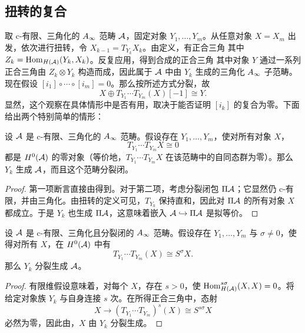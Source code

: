 \subsection{扭转的复合}\label{sec:5e}
取 c-有限、三角化的 $A_\infty$ 范畴 $\mathcal A$，固定对象 $Y_1,\ldots,Y_m$。从任意对象 $X=X_m$ 出发，依次进行扭转，令 $X_{k-1}=T_{Y_k}X_k$。由定义，有正合三角
其中 $Z_k=\operatorname{Hom}_{H(\mathcal A)}(Y_k,X_k)$。反复应用，得到合成的正合三角
其中对象 $Y$ 通过一系列正合三角由 $Z_k\otimes Y_k$ 构造而成，因此属于 $\mathcal A$ 中由 $Y_k$ 生成的三角化 $A_\infty$ 子范畴。现在假设 $[i_1]\circ\cdots\circ[i_m]=0$。那么按所述方式分裂，故
\begin{equation}\label{eq:5.13}
X\oplus T_{Y_1}\cdots T_{Y_m}(X)[-1]\cong Y.
\end{equation}
显然，这个观察在具体情形中是否有用，取决于能否证明 $[i_k]$ 的复合为零。下面给出两个特别简单的情形：
\begin{corollary}\label{st:5.7}
设 $\mathcal A$ 是 c-有限、三角化的 $A_\infty$ 范畴。假设存在 $Y_1,\ldots,Y_m$，使对所有对象 $X$，
\begin{equation}\label{eq:5.14}
T_{Y_1}\cdots T_{Y_m}X\cong0
\end{equation}
都是 $H^0(\mathcal A)$ 的零对象（等价地，$T_{Y_1}\cdots T_{Y_m}X$ 在该范畴中的自同态群为零）。那么 $Y_k$ 生成 $\mathcal A$，而且这个范畴分裂闭。
\end{corollary}
\begin{proof}
第一项断言直接由得到。对于第二项，考虑分裂闭包 $\Pi\mathcal A$；它显然仍 c-有限，并由三角化。由扭转的定义可见，$T_{Y_k}$ 保持直和，因此对 $\Pi\mathcal A$ 的所有对象 $X$ 都成立。于是 $Y_k$ 也生成 $\Pi\mathcal A$，这意味着嵌入 $\mathcal A\hookrightarrow\Pi\mathcal A$ 是拟等价。
\end{proof}
\begin{corollary}\label{st:5.8}
设 $\mathcal A$ 是 c-有限、三角化且分裂闭的 $A_\infty$ 范畴。假设存在 $Y_1,\ldots,Y_m$ 与 $\sigma\ne0$，使得对所有 $X$，在 $H^0(\mathcal A)$ 中有
\[
T_{Y_1}\cdots T_{Y_m}(X)\cong S^{\sigma}X.
\]
那么 $Y_k$ 分裂生成 $\mathcal A$。
\end{corollary}
\begin{proof}
有限维假设意味着，对每个 $X$，存在 $s>0$，使 $\operatorname{Hom}^{s\sigma}_{H(\mathcal A)}(X,X)=0$。将给定对象族 $Y_k$ 与自身连接 $s$ 次。在所得正合三角中，态射
\[
X\longrightarrow(T_{Y_1}\cdots T_{Y_m})^s(X)\cong S^{s\sigma}X
\]
必然为零，因此由，$X$ 由 $Y_k$ 分裂生成。
\end{proof}


